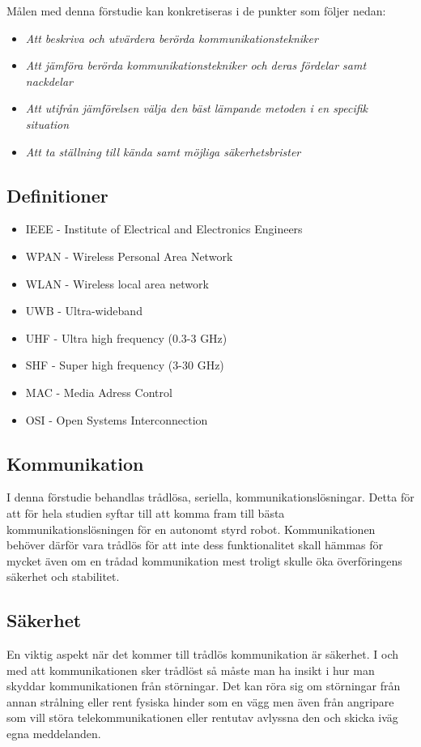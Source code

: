 \documentclass[11pt]{article}
\begin{document}
\begin{flushleft}
Målen med denna förstudie kan konkretiseras i de punkter som följer nedan:
\begin{itemize}
  \item \textit{Att beskriva och utvärdera berörda kommunikationstekniker}
  \item \textit{Att jämföra berörda kommunikationstekniker och deras fördelar samt nackdelar}
  \item \textit{Att utifrån jämförelsen välja den bäst lämpande metoden i en specifik situation}
  \item \textit{Att ta ställning till kända samt möjliga säkerhetsbrister}
\end{itemize}

\subsection{Definitioner}
\begin{itemize}
\item IEEE - Institute of Electrical and Electronics Engineers
\item WPAN - Wireless Personal Area Network
\item WLAN - Wireless local area network
\item UWB - Ultra-wideband
\item UHF - Ultra high frequency (0.3-3 GHz)
\item SHF - Super high frequency (3-30 GHz)
\item MAC - Media Adress Control
\item OSI - Open Systems Interconnection
\end{itemize}


\subsection{Kommunikation}
I denna förstudie behandlas trådlösa, seriella, kommunikationslösningar. Detta för att för hela studien syftar till att komma fram till bästa kommunikationslösningen för en autonomt styrd robot. Kommunikationen behöver därför vara trådlös för att inte dess funktionalitet skall hämmas för mycket även om en trådad kommunikation mest troligt skulle öka överföringens säkerhet och stabilitet. 

\subsection{Säkerhet}
En viktig aspekt när det kommer till trådlös kommunikation är säkerhet. I och med att kommunikationen sker trådlöst så måste man ha insikt i hur man skyddar kommunikationen från störningar. Det kan röra sig om störningar från annan strålning eller rent fysiska hinder som en vägg men även från angripare som vill störa telekommunikationen eller rentutav avlyssna den och skicka iväg egna meddelanden.


\end{flushleft}
\end{document}
